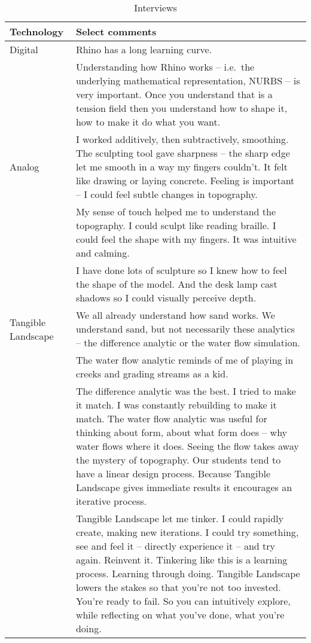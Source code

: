 \begin{table}
\caption{Interviews}
\begin{tabular}{p{} p{ }}
\toprule
Technology & Select comments\\
\midrule
%
Digital
%
& Rhino has a long learning curve.\\
& Understanding how Rhino works 
-- i.e.~the underlying mathematical representation, NURBS -- is very important. 
Once you understand that is a tension field 
then you understand how to shape it, how to make it do what you want.\\
%
Analog 
%
& I worked additively, then subtractively, smoothing.
The sculpting tool gave sharpness --
the sharp edge let me smooth in a way my fingers couldn't.
It felt like drawing or laying concrete.
Feeling is important -- I could feel subtle changes in topography.\\
& My sense of touch helped me to understand the topography.
I could sculpt like reading braille. I could feel the shape with my fingers.
It was intuitive and calming.\\
& I have done lots of sculpture so
I knew how to feel the shape of the model. 
And the desk lamp cast shadows so I could visually perceive depth.\\
%
Tangible Landscape
% 
& We all already understand how sand works. 
We understand sand, but not necessarily these analytics 
-- the difference analytic or the water flow simulation.\\
& The water flow analytic reminds of me of playing 
in creeks and grading streams as a kid.\\
& The difference analytic was the best. 
I tried to make it match. 
I was constantly rebuilding to make it match.
The water flow analytic was useful for thinking about form, 
about what form does --  why water flows where it does.
Seeing the flow takes away the mystery of topography.
Our students tend to have a linear design process.
Because Tangible Landscape gives immediate results 
it encourages an iterative process. \\
& Tangible Landscape let me tinker. 
I could rapidly create, making new iterations. 
I could try something, see and feel it -- directly experience it --
and try again. Reinvent it.
Tinkering like this is a learning process. Learning through doing.
Tangible Landscape lowers the stakes so that you're not too invested.
You're ready to fail. So you can intuitively explore, 
while reflecting on what you've done,
what you're doing.\\
%
\bottomrule
\end{tabular}
\label{table:interviews}
\end{table}